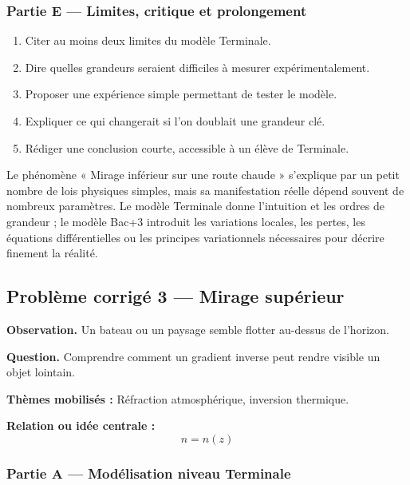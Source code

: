 \documentclass[11pt,a4paper]{article}
\begin{document}
\subsubsection*{Partie E — Limites, critique et prolongement}

\begin{enumerate}
  \item Citer au moins deux limites du modèle Terminale.
  \item Dire quelles grandeurs seraient difficiles à mesurer expérimentalement.
  \item Proposer une expérience simple permettant de tester le modèle.
  \item Expliquer ce qui changerait si l'on doublait une grandeur clé.
  \item Rédiger une conclusion courte, accessible à un élève de Terminale.
\end{enumerate}

\begin{corrigebox}
Le phénomène « Mirage inférieur sur une route chaude » s'explique par un petit nombre de lois physiques simples, mais sa manifestation réelle dépend souvent de nombreux paramètres. Le modèle Terminale donne l'intuition et les ordres de grandeur ; le modèle Bac+3 introduit les variations locales, les pertes, les équations différentielles ou les principes variationnels nécessaires pour décrire finement la réalité.
\end{corrigebox}

\subsection{Problème corrigé 3 — Mirage supérieur}

\begin{exercicebox}
\textbf{Observation.} Un bateau ou un paysage semble flotter au-dessus de l'horizon.

\medskip
\textbf{Question.} Comprendre comment un gradient inverse peut rendre visible un objet lointain.

\medskip
\textbf{Thèmes mobilisés :} Réfraction atmosphérique, inversion thermique.

\medskip
\textbf{Relation ou idée centrale :}
\[
n=n(z)
\]
\end{exercicebox}

\subsubsection*{Partie A — Modélisation niveau Terminale}
\end{document}
